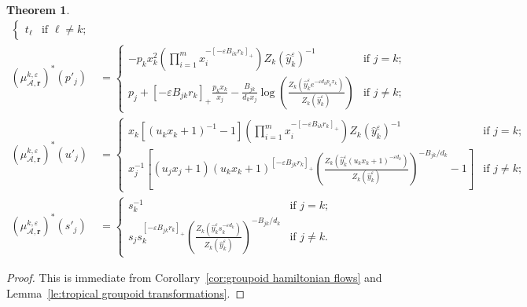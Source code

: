 \documentclass{amsart}
\newtheorem{theorem}{Theorem}[section]
\numberwithin{equation}{section}
\newcommand{\bfr}{{\boldsymbol{r}}}
\newcommand{\cA}{\mathcal{A}}
\begin{document}
\begin{theorem}
\begin{align}
\begin{cases}
      t_\ell & \text{if $\ell\ne k$;}
    \end{cases}\\
    \nonumber
    (\mu_{\cA,\bfr}^{k,\varepsilon})^*(p'_j)&=
    \begin{cases} 
      -p_k x_k^2 \left(\prod_{i=1}^m x_i^{-[-\varepsilon B_{ik} r_k]_+}\right) Z_k(\hat y_k^\varepsilon)^{-1} & \text{if $j=k$;}\\ 
      p_j + [-\varepsilon B_{jk} r_k]_+ \frac{p_k x_k}{x_j} - \frac{B_{jk}}{d_k x_j}\log\left(\frac{Z_k\left(\hat y_k^\varepsilon e^{-\varepsilon d_kp_kx_k}\right)}{Z_k(\hat y_k^\varepsilon)}\right) & \text{if $j\ne k$;}
    \end{cases}\\
    \nonumber
    (\mu_{\cA,\bfr}^{k,\varepsilon})^*(u'_j)
    &=\begin{cases}
      x_k \left[ (u_k x_k +1)^{-1} -1\right] \left(\prod_{i=1}^m x_i^{-[-\varepsilon B_{ik} r_k]_+}\right) Z_k(\hat y_k^\varepsilon)^{-1} & \text{if $j=k$;}\\ 
      x_j^{-1} \left[ (u_j x_j + 1) (u_k x_k + 1)^{[-\varepsilon B_{jk} r_k]_+} \left(\frac{Z_k\left(\hat y_k^\varepsilon (u_k x_k +1)^{-\varepsilon d_k}\right)}{Z_k(\hat y_k^\varepsilon)}\right)^{-B_{jk}/d_k} - 1\right] & \text{if $j\ne k$;}
    \end{cases}\\
    \label{eq:DA mutation}
    (\mu_{\cA,\bfr}^{k,\varepsilon})^*(s'_j)
    &=\begin{cases} 
      s_k^{-1} & \text{if $j=k$;}\\ 
      s_j s_k^{[-\varepsilon B_{jk} r_k]_+} \left(\frac{Z_k\left(\hat y_k^\varepsilon s_k^{-\varepsilon d_k}\right)}{Z_k(\hat y_k^\varepsilon)}\right)^{-B_{jk}/d_k} & \text{if $j\ne k$.}
    \end{cases}
  \end{align}
\end{theorem}
\begin{proof}
  This is immediate from Corollary~\ref{cor:groupoid hamiltonian flows} and Lemma~\ref{le:tropical groupoid transformations}.
\end{proof}
\end{document}
